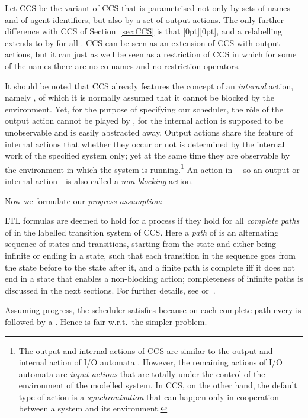 \documentclass[smallcondensed]{svjour3}
\newcommand{\plat}[1]{\raisebox{0pt}[0pt][0pt]{#1}}  \def\precond#1{{\vphantom{#1}}^\bullet #1}
\newcommand{\Sect}[1]{Section~\ref{sec:#1}}
\begin{document}
Let CCS be the variant of CCS that is parametrised not only by sets  of names and
 of agent identifiers, but also by a set  of output actions. The only further
difference with CCS of \Sect{CCS} is that \plat{}, and a relabelling 
extends to  by  for all .
CCS can be seen as an extension of CCS with output actions, but it can just as well be seen as a
restriction of CCS in which for some of the names there are no co-names and no restriction operators.

It should be noted that CCS already features the concept of an \emph{internal} action, namely
, of which it is normally assumed that it cannot be blocked by the environment.
Yet, for the purpose of specifying our scheduler, the r\^ole of the output action  cannot be played
by , for the internal action is supposed to be unobservable and is easily
abstracted away. Output actions share the feature of internal actions that whether they
occur or not is determined by the internal work of the specified system only; yet at the same
time they are observable by the environment in which the system is running.\footnote{The output
    and internal actions of CCS are similar to the output and internal action of I/O automata \cite{LT89}.
    However, the remaining actions of I/O automata are \emph{input actions} that are totally under
    the control of the environment of the modelled system. In CCS, on the other hand, the default type
    of action is a \emph{synchronisation} that can happen only in cooperation between a system and
    its environment.}
An action in ---so an output or internal action---is also called a \emph{non-blocking} action.

Now we formulate our \emph{progress assumption}\cite{TR13,GH14}:


LTL formulas are deemed to hold for a process  if they hold for all \emph{complete
paths} of  in the labelled transition system of CCS. Here a \emph{path} of
 is an alternating sequence of states and transitions, starting from the state  and
either being infinite or ending in a state, such that each transition in the sequence goes from the
state before to the state after it, and a finite path is complete iff it does not end in a state that
enables a non-blocking action; completeness of infinite paths is discussed in the next
sections. For further details, see \cite[Section 9.1]{TR13} or~\cite{GH14}.

Assuming progress,
the scheduler  
satisfies  because on each complete
  path every  is followed by a . Hence  is fair w.r.t.\ the simpler problem.
\end{document}
